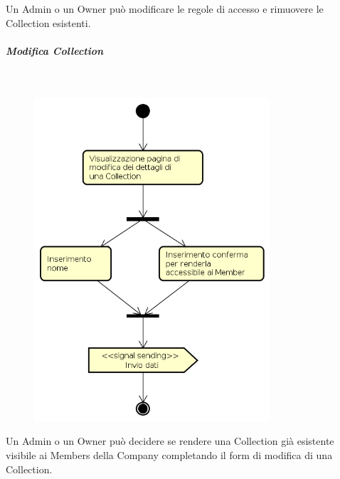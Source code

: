 Un Admin o un Owner può modificare le regole di accesso e rimuovere le Collection esistenti.
\newpage
\subparagraph{Modifica Collection} \mbox{} \\
\begin{figure}[H]
\begin{center}
\includegraphics[height=12cm]{res/sections/backend/activities/modificaDatiCollection.png}
\end{center}
\end{figure}
Un Admin o un Owner può decidere se rendere una Collection già esistente visibile ai Members della Company completando il form di modifica di una Collection.
\newpage
